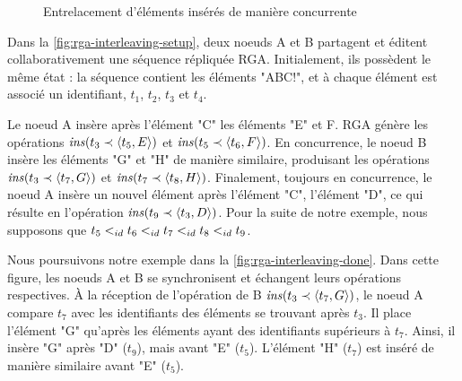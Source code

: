 \begin{figure}[!ht]
{\begin{minipage}{\linewidth}
{
          \label{fig:rga-interleaving-done}
        }
      \end{minipage}
    }
  \caption{Entrelacement d'éléments insérés de manière concurrente}
  \label{fig:rga-interleaving}
\end{figure}

Dans la \autoref{fig:rga-interleaving-setup}, deux noeuds A et B partagent et éditent collaborativement une séquence répliquée \ac{RGA}.
Initialement, ils possèdent le même état : la séquence contient les éléments "ABC!", et à chaque élément est associé un identifiant, \eg $t_1$, $t_2$, $t_3$ et $t_4$.

Le noeud A insère après l'élément "C" les éléments "E" et F.
RGA génère les opérations $\mathit{ins}(t_3 \prec \langle t_5,E \rangle)$ et $\mathit{ins}(t_5 \prec \langle t_6,F \rangle)$.
En concurrence, le noeud B insère les éléments "G" et "H" de manière similaire, produisant les opérations  $\mathit{ins}(t_3 \prec \langle t_7,G \rangle)$ et $\mathit{ins}(t_7 \prec \langle t_8,H \rangle)$.
Finalement, toujours en concurrence, le noeud A insère un nouvel élément après l'élément "C", l'élément "D", ce qui résulte en l'opération $\mathit{ins}(t_9 \prec \langle t_3,D \rangle)$.
Pour la suite de notre exemple, nous supposons que $t_5 <_{id} t_6 <_{id} t_7 <_{id} t_8 <_{id} t_9$.

Nous poursuivons notre exemple dans la \autoref{fig:rga-interleaving-done}.
Dans cette figure, les noeuds A et B se synchronisent et échangent leurs opérations respectives.
À la réception de l'opération de B $\mathit{ins}(t_3 \prec \langle t_7,G \rangle)$, le noeud A compare $t_7$ avec les identifiants des éléments se trouvant après $t_3$.
Il place l'élément "G" qu'après les éléments ayant des identifiants supérieurs à $t_7$.
Ainsi, il insère "G" après "D" ($t_9$), mais avant "E" ($t_5$).
L'élément "H" ($t_7$) est inséré de manière similaire avant "E" ($t_5$).


